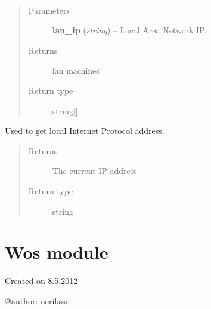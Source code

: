 \documentclass[letterpaper,10pt,english]{sphinxmanual}
\begin{document}

\begin{fulllineitems}
\label{api:utils.get_lan_machines}~\begin{quote}\begin{description}
\item[{Parameters}] \leavevmode
\textbf{lan\_ip} (\emph{string}) -- Local Area Network IP.

\item[{Returns}] \leavevmode
lan machines

\item[{Return type}] \leavevmode
string{[}{]}

\end{description}\end{quote}

\end{fulllineitems}


\begin{fulllineitems}
\label{api:utils.get_local_ip_address}
Used to get local Internet Protocol address.
\begin{quote}\begin{description}
\item[{Returns}] \leavevmode
The current IP address.

\item[{Return type}] \leavevmode
string

\end{description}\end{quote}

\end{fulllineitems}



\section{Wos module}
\label{api:wos-module}\label{api:module-wos}
Created on 8.5.2012

@author: neriksso
\end{document}
